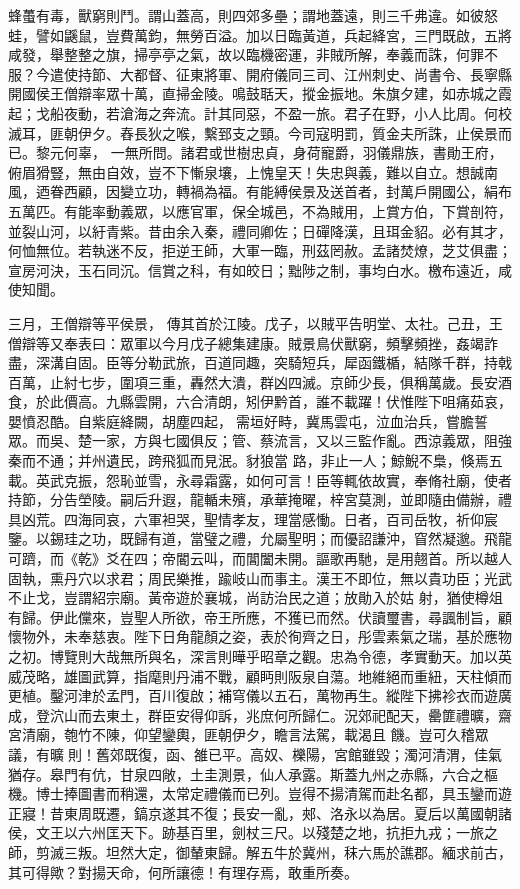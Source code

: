 \begin{pinyinscope}
 蜂蠆有毒，獸窮則鬥。謂山蓋高，則四郊多壘；謂地蓋遠，則三千弗違。如彼怒蛙，譬如鼷鼠，豈費萬鈞，無勞百溢。加以日臨黃道，兵起絳宮，三門既啟，五將咸發，舉整整之旗，掃亭亭之氣，故以臨機密運，非賊所解，奉義而誅，何罪不服？今遣使持節、大都督、征東將軍、開府儀同三司、江州刺史、尚書令、長寧縣開國侯王僧辯率眾十萬，直掃金陵。鳴鼓聒天，摐金振地。朱旗夕建，如赤城之霞起；戈船夜動，若滄海之奔流。計其同惡，不盈一旅。君子在野，小人比周。何校滅耳，匪朝伊夕。舂長狄之喉，繫郅支之頸。今司寇明罰，質金夫所誅，止侯景而已。黎元何辜，
 一無所問。諸君或世樹忠貞，身荷寵爵，羽儀鼎族，書勛王府，俯眉猾豎，無由自效，豈不下慚泉壤，上愧皇天！失忠與義，難以自立。想誠南風，迺眷西顧，因變立功，轉禍為福。有能縛侯景及送首者，封萬戶開國公，絹布五萬匹。有能率動義眾，以應官軍，保全城邑，不為賊用，上賞方伯，下賞剖符，並裂山河，以紆青紫。昔由余入秦，禮同卿佐；日磾降漢，且珥金貂。必有其才，何恤無位。若執迷不反，拒逆王師，大軍一臨，刑茲罔赦。孟諸焚燎，芝艾俱盡；宣房河決，玉石同沉。信賞之科，有如皎日；黜陟之制，事均白水。檄布遠近，咸使知聞。



 三月，王僧辯等平侯景，
 傳其首於江陵。戊子，以賊平告明堂、太社。己丑，王僧辯等又奉表曰：眾軍以今月戊子總集建康。賊景鳥伏獸窮，頻擊頻挫，姦竭詐盡，深溝自固。臣等分勒武旅，百道同趣，突騎短兵，犀函鐵楯，結隊千群，持戟百萬，止紂七步，圍項三重，轟然大潰，群凶四滅。京師少長，俱稱萬歲。長安酒食，於此價高。九縣雲開，六合清朗，矧伊黔首，誰不載躍！伏惟陛下咀痛茹哀，嬰憤忍酷。自紫庭絳闕，胡塵四起，需垣好畤，冀馬雲屯，泣血治兵，嘗膽誓眾。而吳、楚一家，方與七國俱反；管、蔡流言，又以三監作亂。西涼義眾，阻強秦而不通；并州遺民，跨飛狐而見泯。豺狼當
 路，非止一人；鯨鯢不梟，倏焉五載。英武克振，怨恥並雪，永尋霜露，如何可言！臣等輒依故實，奉脩社廟，使者持節，分告塋陵。嗣后升遐，龍輴未殯，承華掩曜，梓宮莫測，並即隨由備辦，禮具凶荒。四海同哀，六軍袒哭，聖情孝友，理當感慟。日者，百司岳牧，祈仰宸鑒。以錫珪之功，既歸有道，當璧之禮，允屬聖明；而優詔謙沖，窅然凝邈。飛龍可躋，而《乾》爻在四；帝閽云叫，而閶闔未開。謳歌再馳，是用翹首。所以越人固執，熏丹穴以求君；周民樂推，踰岐山而事主。漢王不即位，無以貴功臣；光武不止戈，豈謂紹宗廟。黃帝遊於襄城，尚訪治民之道；放勛入於姑
 射，猶使樽俎有歸。伊此儻來，豈聖人所欲，帝王所應，不獲已而然。伏讀璽書，尋諷制旨，顧懷物外，未奉慈衷。陛下日角龍顏之姿，表於徇齊之日，彤雲素氣之瑞，基於應物之初。博覽則大哉無所與名，深言則曄乎昭章之觀。忠為令德，孝實動天。加以英威茂略，雄圖武算，指麾則丹浦不戰，顧眄則阪泉自蕩。地維絕而重紐，天柱傾而更植。鑿河津於孟門，百川復啟；補穹儀以五石，萬物再生。縱陛下拂袗衣而遊廣成，登泬山而去東土，群臣安得仰訴，兆庶何所歸仁。況郊祀配天，罍篚禮曠，齋宮清廟，匏竹不陳，仰望鑾輿，匪朝伊夕，瞻言法駕，載渴且
 饑。豈可久稽眾議，有曠則！舊郊既復，函、雒已平。高奴、櫟陽，宮館雖毀；濁河清渭，佳氣猶存。皋門有伉，甘泉四敞，土圭測景，仙人承露。斯蓋九州之赤縣，六合之樞機。博士捧圖書而稍還，太常定禮儀而已列。豈得不揚清駕而赴名都，具玉鑾而遊正寢！昔東周既遷，鎬京遂其不復；長安一亂，郟、洛永以為居。夏后以萬國朝諸侯，文王以六州匡天下。跡基百里，劍杖三尺。以殘楚之地，抗拒九戎；一旅之師，剪滅三叛。坦然大定，御輦東歸。解五牛於冀州，秣六馬於譙郡。緬求前古，其可得歟？對揚天命，何所讓德！有理存焉，敢重所奏。




\end{pinyinscope}
